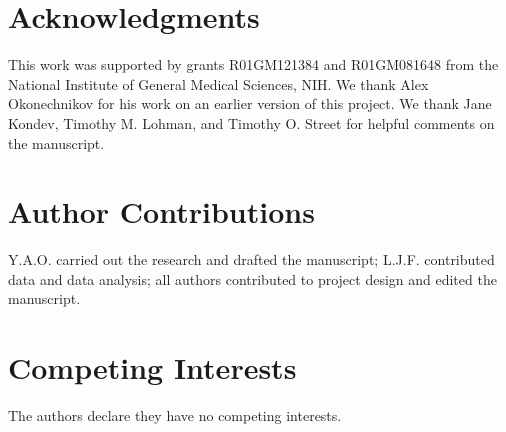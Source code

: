 \section*{Acknowledgments}

This work was supported by grants R01GM121384 and R01GM081648 from the National Institute of General Medical Sciences, NIH. We thank Alex Okonechnikov for his work on an earlier version of this project. We thank Jane Kondev, Timothy M. Lohman, and Timothy O. Street for helpful comments on the manuscript.

\section*{Author Contributions}

Y.A.O. carried out the research and drafted the manuscript; L.J.F. contributed data and data analysis; all authors contributed to project design and edited the manuscript.

\section*{Competing Interests}

The authors declare they have no competing interests.